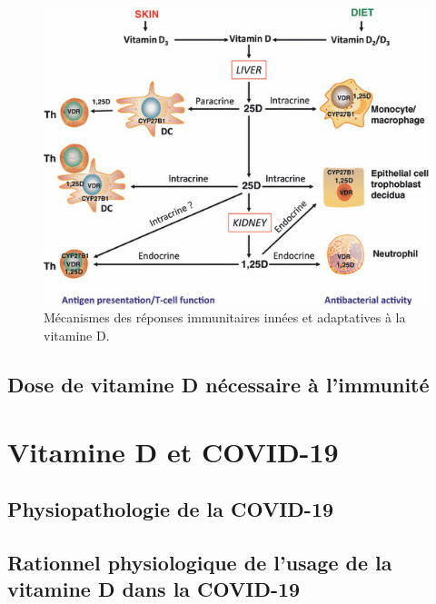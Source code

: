 \documentclass[
  a4paper,
  DIV=11,
  numbers=noendperiod,
  listof=totoc]{scrreprt}
\begin{document}
\begin{figure}

{\centering \includegraphics{figures/meca-intracrine.jpg}

}

\caption{Mécanismes des réponses immunitaires innées et adaptatives à la
vitamine D. \textcite{Hewison.2012.ClinicalEndocrinology}}

\end{figure}

\hypertarget{dose-de-vitamine-d-nuxe9cessaire-uxe0-limmunituxe9}{%
\section{Dose de vitamine D nécessaire à
l'immunité}\label{dose-de-vitamine-d-nuxe9cessaire-uxe0-limmunituxe9}}

\textcite{Hewison.2007}

\newpage{}

\hypertarget{vitamine-d-et-covid-19}{%
\chapter{Vitamine D et COVID-19}\label{vitamine-d-et-covid-19}}

\hypertarget{physiopathologie-de-la-covid-19}{%
\section{Physiopathologie de la
COVID-19}\label{physiopathologie-de-la-covid-19}}

\hypertarget{rationnel-physiologique-de-lusage-de-la-vitamine-d-dans-la-covid-19}{%
\section{Rationnel physiologique de l'usage de la vitamine D dans la
COVID-19}\label{rationnel-physiologique-de-lusage-de-la-vitamine-d-dans-la-covid-19}}
\end{document}
